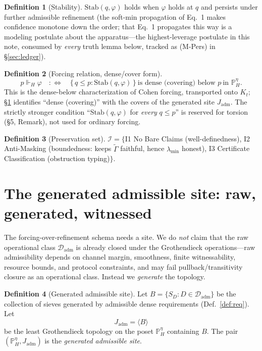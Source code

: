 \documentclass[11pt]{article}
\theoremstyle{definition}
\newtheorem{definition}{Definition}
\theoremstyle{remark}
\newcommand{\forcesH}{\Vdash_{H}}
\newcommand{\PHeta}{\mathbb{P}_{H}^{\eta}}
\newcommand{\refines}{\leq}
\newcommand{\Gam}{\tilde{\Gamma}}
\newcommand{\lmin}{\lambda_{\min}}
\newcommand{\Stab}{\mathrm{Stab}}
\newcommand{\Kt}{K_{t}}
\newcommand{\Dadm}{\mathcal{D}_{\mathrm{adm}}}
\newcommand{\Jadm}{J_{\mathrm{adm}}}
\begin{document}
\begin{definition}[Stability]
$\Stab(q,\varphi)$ holds when $\varphi$ holds at $q$ and persists under further admissible
refinement (the soft-min propagation of Eq.~1 makes confidence monotone down the order; that Eq.~1
propagates this way is a modeling postulate about the apparatus---the highest-leverage postulate in
this note, consumed by \emph{every} truth lemma below, tracked as (M-Pers) in \S\ref{sec:ledger}).
\end{definition}

\begin{definition}[Forcing relation, dense/cover form]\label{def:force}
\[
  p \forcesH \varphi
  \quad:\Longleftrightarrow\quad
  \{\,q\refines p : \Stab(q,\varphi)\,\}\ \text{is dense (covering) below }p\ \text{in } \PHeta.
\]
This is the dense-below characterization of Cohen forcing, transported onto $\Kt$; \S\ref{sec:site}
identifies ``dense (covering)'' with the covers of the generated site $\Jadm$. The strictly stronger
condition ``$\Stab(q,\varphi)$ for \emph{every} $q\refines p$'' is reserved for torsion (\S5,
Remark), not used for ordinary forcing.
\end{definition}

\begin{definition}[Preservation set]
$\mathcal{I}=\{$I1 No Bare Claims (well-definedness), I2 Anti-Masking (boundedness: keeps $\Gam$
faithful, hence $\lmin$ honest), I3 Certificate Classification (obstruction typing)$\}$.
\end{definition}

\section{The generated admissible site: raw, generated, witnessed}\label{sec:site}

The forcing-over-refinement schema needs a site. We do \emph{not} claim that the raw operational
class $\Dadm$ is already closed under the Grothendieck operations---raw admissibility depends on
channel margin, smoothness, finite witnessability, resource bounds, and protocol constraints, and may
fail pullback/transitivity closure as an operational class. Instead we \emph{generate} the topology.

\begin{definition}[Generated admissible site]\label{def:site}
Let $B=\{S_D:D\in\Dadm\}$ be the collection of sieves generated by admissible dense requirements
(Def.~\ref{def:req}). Let
\[
  \Jadm=\langle B\rangle
\]
be the least Grothendieck topology on the poset $\PHeta$ containing $B$. The pair $(\PHeta,\Jadm)$ is
the \emph{generated admissible site}.
\end{definition}
\end{document}
